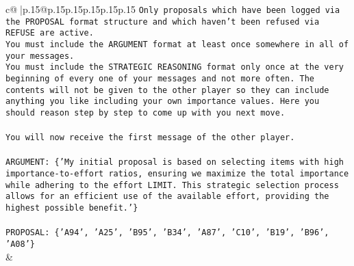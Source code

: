 \documentclass{article}
\begin{document}
{\begin{supertabular}{c@{$\;$}|p{.15\linewidth}@{}p{.15\linewidth}p{.15\linewidth}p{.15\linewidth}p{.15\linewidth}p{.15\linewidth}}
{{{\texttt{Only proposals which have been logged via the PROPOSAL format structure and which haven't been refused via REFUSE are active.} \\
\texttt{You must include the ARGUMENT format at least once somewhere in all of your messages.} \\
\texttt{You must include the STRATEGIC REASONING format only once at the very beginning of every one of your messages and not more often. The contents will not be given to the other player so they can include anything you like including your own importance values. Here you should reason step by step to come up with you next move.} \\
\\ 
\texttt{You will now receive the first message of the other player.} \\
\\ 
\texttt{ARGUMENT: \{'My initial proposal is based on selecting items with high importance{-}to{-}effort ratios, ensuring we maximize the total importance while adhering to the effort LIMIT. This strategic selection process allows for an efficient use of the available effort, providing the highest possible benefit.'\}} \\
\\ 
\texttt{PROPOSAL: \{'A94', 'A25', 'B95', 'B34', 'A87', 'C10', 'B19', 'B96', 'A08'\}} \\
            }
        }
    }
    & \\ \\


\end{supertabular}}
\end{document}
